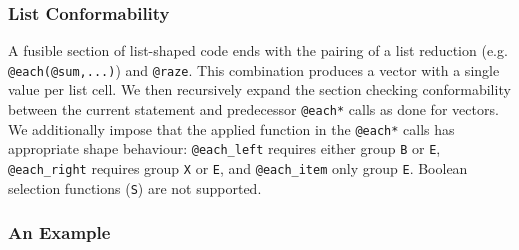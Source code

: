 \subsubsection{List Conformability}

A fusible section of list-shaped code ends with the pairing of a list reduction
(e.g. \texttt{@each(@sum,...)}) and \texttt{@raze}. This combination produces a
vector with a single value per list cell. We then recursively expand the section
checking conformability between the current statement and predecessor \texttt{@each*}
calls as done for vectors. We additionally impose that the applied function in the
\texttt{@each*} calls has appropriate shape behaviour:  \texttt{@each_left} requires
either group \texttt{B} or \texttt{E}, \texttt{@each_right} requires group \texttt{X}
or \texttt{E}, and \texttt{@each_item} only group \texttt{E}. Boolean selection
functions (\texttt{S}) are not supported.

% 


% 
% 

\subsubsection{An Example}

